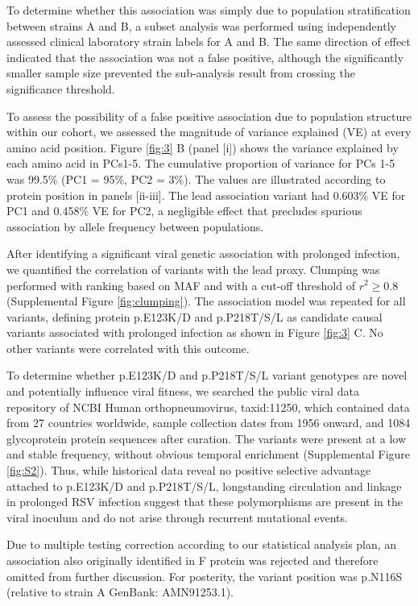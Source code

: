 \documentclass[9pt,lineno]{elife}  %
\begin{document}
To determine whether this association was simply due to population stratification between strains A and B, a subset analysis was performed using independently assessed clinical laboratory strain labels for A and B. 
The same direction of effect indicated that the association was not a false positive, although the significantly smaller sample size prevented the sub-analysis result from crossing the significance threshold.

To assess the possibility of a false positive association due to population structure within our cohort, we assessed the magnitude of variance explained (VE) at every amino acid position. Figure \ref{fig:3} B (panel [i]) shows the variance explained by each amino acid in PCs1-5. 
The cumulative proportion of variance for PCs 1-5 was 99.5\% (PC1 = 95\%, PC2 = 3\%). The values are illustrated according to protein position in panels [ii-iii]. 
The lead association variant had 0.603\% VE for PC1 and 0.458\% VE for PC2, a negligible effect that precludes spurious association by allele frequency between populations.

After identifying a significant viral genetic association with prolonged infection, we quantified the correlation of variants with the lead proxy. 
Clumping was performed with ranking based on MAF and with a cut-off threshold of $r^2 \ge 0.8$ (Supplemental Figure \ref{fig:clumping}). 
The association model was repeated for all variants, defining protein p.E123K/D and p.P218T/S/L as candidate causal variants associated with prolonged infection as shown in Figure \ref{fig:3} C. 
No other variants were correlated with this outcome.

To determine whether p.E123K/D and p.P218T/S/L variant genotypes are novel and potentially influence viral fitness, we searched the public viral data repository of NCBI Human orthopneumovirus, taxid:11250, which contained data from 27 countries worldwide, sample collection dates from 1956 onward, and 1084 glycoprotein protein sequences after curation. 
The variants were present at a low and stable frequency, without obvious temporal enrichment (Supplemental Figure \ref{fig:S2}). 
Thus, while historical data reveal no positive selective advantage attached to p.E123K/D and p.P218T/S/L, longstanding circulation and linkage in prolonged RSV infection suggest that these polymorphisms are present in the viral inoculum and do not arise through recurrent mutational events.

Due to multiple testing correction according to our statistical analysis plan, an association also originally identified in F protein was rejected and therefore omitted from further discussion. 
For posterity, the variant position was p.N116S (relative to strain A GenBank: AMN91253.1).
\end{document}
